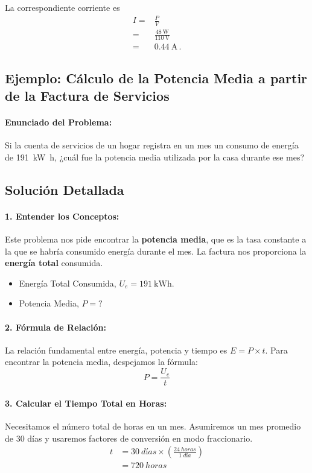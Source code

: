 \documentclass[11pt,a4paper]{book}
\begin{document}
La correspondiente corriente es
\begin{align*}
    I =& \frac{P}{V}\\
     = &\frac{\qty{48}{\watt}}{\qty{110}{\volt}}\\
       =& \qty{0.44}{\ampere}\,.
\end{align*}


\subsection{Ejemplo: Cálculo de la Potencia Media a partir de la Factura de Servicios}

\paragraph{Enunciado del Problema:}
Si la cuenta de servicios de un hogar registra en un mes un consumo de energía de \qty{191}{\kilo\watt\hour}, ¿cuál fue la potencia media utilizada por la casa durante ese mes?

\subsection*{Solución Detallada}

\paragraph{1. Entender los Conceptos:}
Este problema nos pide encontrar la \textbf{potencia media}, que es la tasa constante a la que se habría consumido energía durante el mes. La factura nos proporciona la \textbf{energía total} consumida.
\begin{itemize}
    \item Energía Total Consumida, $U_e = \qty{191}{\kilo\watt\hour}$.
    \item Potencia Media, $P = \text{?}$
\end{itemize}

\paragraph{2. Fórmula de Relación:}
La relación fundamental entre energía, potencia y tiempo es $E = P \times t$. Para encontrar la potencia media, despejamos la fórmula:
\[ P = \frac{U_e}{t} \]

\paragraph{3. Calcular el Tiempo Total en Horas:}
Necesitamos el número total de horas en un mes. Asumiremos un mes promedio de 30 días y usaremos factores de conversión en modo fraccionario.
\begin{align*}
    t &= \qty{30}{días} \times \left( \frac{\qty{24}{horas}}{\qty{1}{día}} \right) \\
      &= \qty{720}{horas}
\end{align*}
\end{document}
